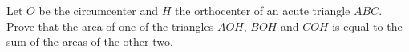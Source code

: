 Let $O$ be the circumcenter and $H$ the orthocenter of an acute triangle $ABC$. Prove that the area of one of the triangles $AOH$, $BOH$ and $COH$ is equal to the sum of the areas of the other two.